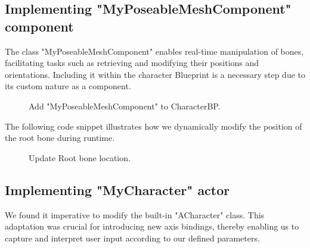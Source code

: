 \documentclass[12pt]{book}
\begin{document}
\subsection{Implementing "MyPoseableMeshComponent" component}
The class "MyPoseableMeshComponent" enables real-time manipulation of bones, facilitating tasks such as retrieving and modifying their positions and orientations. Including it within the character Blueprint is a necessary step due to its custom nature as a component.  

 \begin{figure}[!h]
    \centering
    \caption{Add "MyPoseableMeshComponent" to CharacterBP.}
   \end{figure}

The following code snippet illustrates how we dynamically modify the position of the root bone during runtime.

  \begin{figure}[!h]
    \centering
    \caption{Update Root bone location.}
   \end{figure}

\subsection{Implementing "MyCharacter" actor}

We found it imperative to modify the built-in "ACharacter" class. This adaptation was crucial for introducing new axis bindings, thereby enabling us to capture and interpret user input according to our defined parameters.
\end{document}
